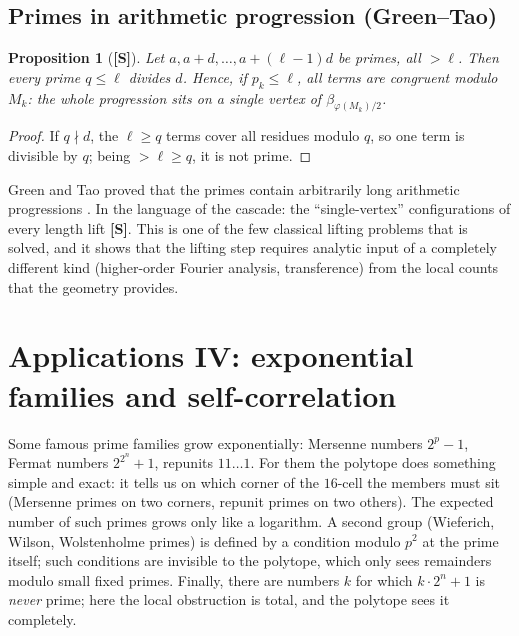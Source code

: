 \documentclass[11pt,a4paper]{article}
\newcommand{\statS}{\textsf{\textbf{[S]}}}
\theoremstyle{plain}
\newtheorem{proposition}[theorem]{Proposition}
\theoremstyle{definition}
\theoremstyle{remark}
\begin{document}
\subsection{Primes in arithmetic progression (Green--Tao)}
\begin{proposition}[\statS]\label{prop:ap}
Let $a,a+d,\dots,a+(\ell-1)d$ be primes, all $>\ell$. Then every prime
$q\le\ell$ divides $d$. Hence, if $p_k\le\ell$, all terms are congruent modulo
$M_k$: the whole progression sits on a single vertex of
$\beta_{\varphi(M_k)/2}$.
\end{proposition}
\begin{proof}
If $q\nmid d$, the $\ell\ge q$ terms cover all residues modulo $q$, so one term
is divisible by $q$; being $>\ell\ge q$, it is not prime.
\end{proof}
Green and Tao proved that the primes contain arbitrarily long arithmetic
progressions \cite{GreenTao}. In the language of the cascade: the
``single-vertex'' configurations of every length lift \statS. This is one of
the few classical lifting problems that is solved, and it shows that the
lifting step requires analytic input of a completely different kind
(higher-order Fourier analysis, transference) from the local counts that the
geometry provides.

\section{Applications IV: exponential families and self-correlation}\label{sec:exp}

\begin{plainwords}
Some famous prime families grow exponentially: Mersenne numbers $2^p-1$,
Fermat numbers $2^{2^n}+1$, repunits $11\ldots1$. For them the polytope does
something simple and exact: it tells us on which corner of the $16$-cell the
members must sit (Mersenne primes on two corners, repunit primes on two
others). The expected number of such primes grows only like a logarithm. A
second group (Wieferich, Wilson, Wolstenholme primes) is defined by a
condition modulo $p^2$ at the prime itself; such conditions are invisible to
the polytope, which only sees remainders modulo small fixed primes. Finally,
there are numbers $k$ for which $k\cdot2^n+1$ is \emph{never} prime; here the
local obstruction is total, and the polytope sees it completely.
\end{plainwords}
\end{document}
